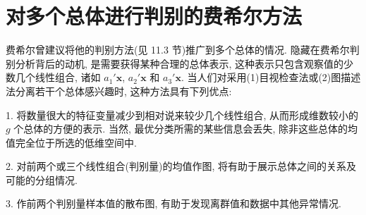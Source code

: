 \section{对多个总体进行判别的费希尔方法}  %
\label{sec:11.6}

费希尔曾建议将他的判别方法(见 11.3 节)推广到多个总体的情况. 隐藏在费希尔判别分析背后的动机, 是需要获得某种合理的总体表示, 这种表示只包含观察值的少数几个线性组合, 诸如 $a_1'\mathbf{x}$, $a_2'\mathbf{x}$ 和 $a_3'\mathbf{x}$. 当人们对采用(1)目视检查法或(2)图描述法分离若干个总体感兴趣时, 这种方法具有下列优点:

1. 将数量很大的特征变量减少到相对说来较少几个线性组合, 从而形成维数较小的 $g$ 个总体的方便的表示. 当然, 最优分类所需的某些信息会丢失, 除非这些总体的均值完全位于所选的低维空间中.

2. 对前两个或三个线性组合(判别量)的均值作图, 将有助于展示总体之间的关系及可能的分组情况.

3. 作前两个判别量样本值的散布图, 有助于发现离群值和数据中其他异常情况.
